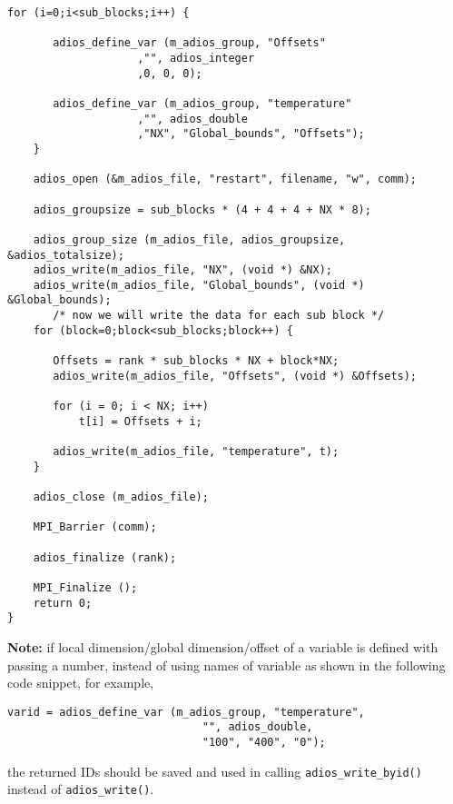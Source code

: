 \begin{lstlisting}[alsolanguage=C]
    for (i=0;i<sub_blocks;i++) {

       adios_define_var (m_adios_group, "Offsets"
                    ,"", adios_integer
                    ,0, 0, 0);

       adios_define_var (m_adios_group, "temperature"
                    ,"", adios_double
                    ,"NX", "Global_bounds", "Offsets");
    }

    adios_open (&m_adios_file, "restart", filename, "w", comm);

    adios_groupsize = sub_blocks * (4 + 4 + 4 + NX * 8);

    adios_group_size (m_adios_file, adios_groupsize, &adios_totalsize);
    adios_write(m_adios_file, "NX", (void *) &NX);
    adios_write(m_adios_file, "Global_bounds", (void *) &Global_bounds);
       /* now we will write the data for each sub block */
    for (block=0;block<sub_blocks;block++) {

       Offsets = rank * sub_blocks * NX + block*NX;
       adios_write(m_adios_file, "Offsets", (void *) &Offsets);

       for (i = 0; i < NX; i++)
           t[i] = Offsets + i;

       adios_write(m_adios_file, "temperature", t);
    }

    adios_close (m_adios_file);

    MPI_Barrier (comm);

    adios_finalize (rank);

    MPI_Finalize ();
    return 0;
}

\end{lstlisting}


\noindent \textbf{Note:} if local dimension/global 
dimension/offset of a variable is defined with passing a number, instead of using 
names of variable as shown in the following code snippet, for example,

\begin{lstlisting}[alsolanguage=C]
    varid = adios_define_var (m_adios_group, "temperature",
                              "", adios_double,
                              "100", "400", "0");
\end{lstlisting}

\noindent the returned IDs should be saved and used in calling \verb+adios_write_byid()+ instead of \verb+adios_write()+.
